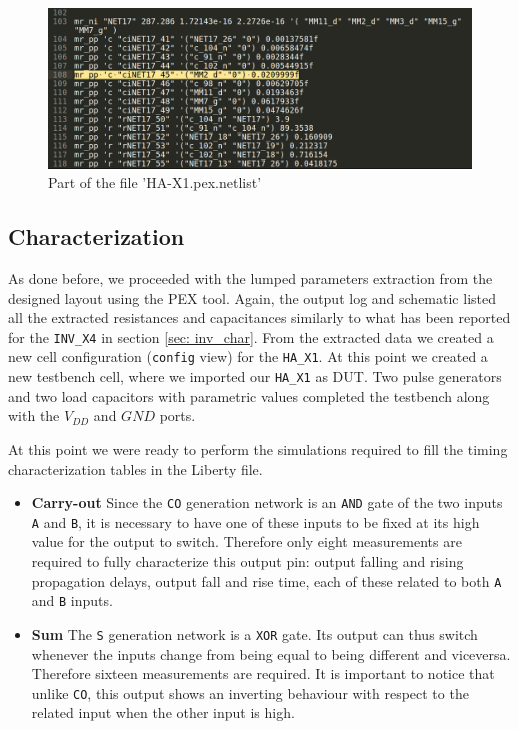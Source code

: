 \documentclass[a4paper]{article}
\newcommand{\inv}{\texttt{INV\_X4}\xspace}
\newcommand{\ha}{\texttt{HA\_X1}\xspace}
\begin{document}
\begin{figure}[H]
      \centering
       \includegraphics[width=12cm]{./Images/HA/HAX1_PEX_netlist.png}
\caption{Part of the file 'HA-X1.pex.netlist'}
\label{fig: PEX0_netlist}
\end{figure}


\subsection{Characterization}
As done before, we proceeded with the lumped parameters extraction from the designed layout using the PEX tool. Again, the output log and schematic listed all the extracted resistances and capacitances similarly to what has been reported for the \inv in section \ref{sec: inv_char}. From the extracted data we created a new cell configuration (\texttt{config} view) for the \ha. At this point we created a new testbench cell, where we imported our \ha as DUT. Two pulse generators and two load capacitors with parametric values completed the testbench along with the $V_{DD}$ and $GND$ ports.

At this point we were ready to perform the simulations required to fill the timing characterization tables in the Liberty file.
\begin{itemize}
	\item \textbf{Carry-out} Since the \texttt{CO} generation network is an \texttt{AND} gate of the two inputs \texttt{A} and \texttt{B}, it is necessary to have one of these inputs to be fixed at its high value for the output to switch. Therefore only eight measurements are required to fully characterize this output pin: output falling and rising propagation delays, output fall and rise time, each of these related to both \texttt{A} and \texttt{B} inputs.

	\item \textbf{Sum} The \texttt{S} generation network is a \texttt{XOR} gate. Its output can thus switch whenever the inputs change from being equal to being different and viceversa. Therefore sixteen measurements are required. It is important to notice that unlike \texttt{CO}, this output shows an inverting behaviour with respect to the related input when the other input is high.
\end{itemize}
\end{document}
